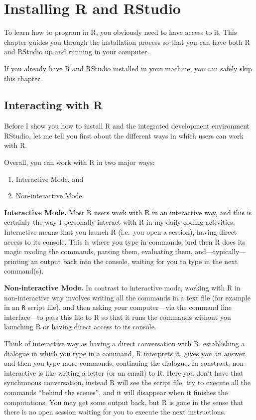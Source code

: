 \documentclass[
]{book}
\begin{document}
\hypertarget{install}{%
\chapter{Installing R and RStudio}\label{install}}

To learn how to program in R, you obviously need to have access to it. This
chapter guides you through the installation process so that you can have both R
and RStudio up and running in your computer.

If you already have R and RStudio installed in your machine, you can safely
skip this chapter.

\hypertarget{interacting-with-r}{%
\section{Interacting with R}\label{interacting-with-r}}

Before I show you how to install R and the integrated development environment
RStudio, let me tell you first about the different ways in which users can
work with R.

Overall, you can work with R in two major ways:

\begin{enumerate}
\def\labelenumi{\arabic{enumi})}
\item
  Interactive Mode, and
\item
  Non-interactive Mode
\end{enumerate}

\textbf{Interactive Mode.} Most R users work with R in an interactive way, and this
is certainly the way I personally interact with R in my daily coding activities.
Interactive means that you launch R (i.e.~you open a session), having direct
access to its console. This is where you type in commands, and then R does its
magic reading the commands, parsing them, evaluating them,
and---typically---printing an output back into the console, waiting for you to
type in the next command(s).

\textbf{Non-interactive Mode.} In contrast to interactive mode, working with R in non-interactive way involves writing all the commands in a text file (for
example in an \texttt{R} script file), and then asking your computer---via the
command line interface---to pass this file to R so that it runs the
commands without you launching R or having direct access to its console.

Think of interactive way as having a direct conversation with R, establishing
a dialogue in which you type in a command, R interprets it, gives you an
answer, and then you type more commands, continuing the dialogue. In constrast,
non-interactive is like writing a letter (or an email) to R. Here you don't
have that synchronous conversation, instead R will see the script file, try to
execute all the commands ``behind the scenes'', and it will disappear when it
finishes the computations. You may get some output back, but R is gone in the
sense that there is no open session waiting for you to execute the next
instructions.
\end{document}
